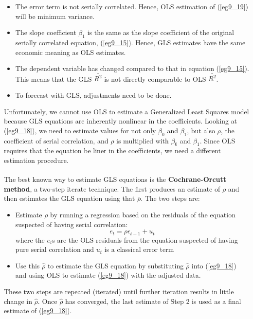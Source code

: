 \documentclass[11pt]{article}
\begin{document}
\begin{itemize}
\item The error term is not serially correlated. Hence, OLS estimation of (\ref{eg9_19}) will be minimum variance.
\item The slope coefficient $\beta_1$ is the same as the slope coefficient of the original serially correlated equation, (\ref{eg9_15}). Hence, GLS estimates have the same economic meaning as OLS estimates. 
\item The dependent variable has changed compared to that in equation (\ref{eg9_15}). This means that the GLS $\bar{R^2}$ is not directly comparable to OLS $\bar{R^2}$.
\item To forecast with GLS, adjustments need to be done. 
\end{itemize}
Unfortunately, we cannot use OLS to estimate a Generalized Least Squares model because GLS equations are inherently nonlinear in the coefficients. Looking at (\ref{eg9_18}), we need to estimate values for not only $\beta_0$ and $\beta_1$, but also $\rho$, the coefficient of serial correlation, and $\rho$ is multiplied with $\beta_0$ and $\beta_1$. Since OLS requires that the equation be liner in the coefficients, we need a different estimation procedure. \\ \\
The best known way to estimate GLS equations is the \textbf{Cochrane-Orcutt method}, a two-step iterate technique. The first produces an estimate of $\rho$ and then estimates the GLS equation using that $\bar{\rho}$. The two steps are:
\begin{itemize}
\item Estimate $\rho$ by running a regression based on the residuals of the equation suspected of having serial correlation:
\begin{equation}
\label{eg9_21} e_t = \rho\epsilon_{t-1} + u_t
\end{equation}
where the $e_t$s are the OLS residuals from the equation suspected of having pure serial correlation and $u_t$ is a classical error term
\item Use this $\hat{\rho}$ to estimate the GLS equation by substituting $\hat{\rho}$ into (\ref{eg9_18}) and using OLS to estimate (\ref{eg9_18}) with the adjusted data.
\end{itemize}
These two steps are repeated (iterated) until further iteration results in little change in $\hat{\rho}$. Once $\hat{\rho}$ has converged, the last estimate of Step 2 is used as a final estimate of (\ref{eg9_18}).\\ \\
\end{document}
